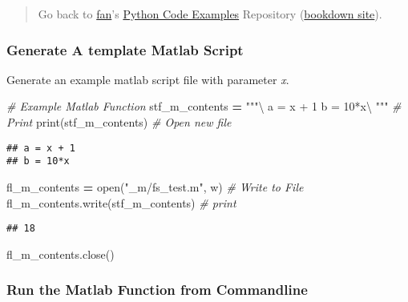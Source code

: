 \documentclass[
]{book}
\newenvironment{Shaded}{\begin{snugshade}}{\end{snugshade}}
\newcommand{\BuiltInTok}[1]{#1}
\newcommand{\CommentTok}[1]{\textcolor[rgb]{0.56,0.35,0.01}{\textit{#1}}}
\newcommand{\NormalTok}[1]{#1}
\newcommand{\OperatorTok}[1]{\textcolor[rgb]{0.81,0.36,0.00}{\textbf{#1}}}
\newcommand{\StringTok}[1]{\textcolor[rgb]{0.31,0.60,0.02}{#1}}
\begin{document}
\begin{quote}
Go back to \href{http://fanwangecon.github.io/}{fan}'s \href{https://fanwangecon.github.io/pyfan/}{Python Code Examples} Repository (\href{https://fanwangecon.github.io/pyfan/bookdown}{bookdown site}).
\end{quote}

\hypertarget{generate-a-template-matlab-script}{%
\subsubsection{Generate A template Matlab Script}\label{generate-a-template-matlab-script}}

Generate an example matlab script file with parameter \emph{x}.

\begin{Shaded}
\begin{Highlighting}[]
\CommentTok{\# Example Matlab Function}
\NormalTok{stf\_m\_contents }\OperatorTok{=} \StringTok{"""\textbackslash{}}
\StringTok{a = x + 1}
\StringTok{b = 10*x\textbackslash{}}
\StringTok{"""}
\CommentTok{\# Print}
\BuiltInTok{print}\NormalTok{(stf\_m\_contents)}
\CommentTok{\# Open new file}
\end{Highlighting}
\end{Shaded}

\begin{verbatim}
## a = x + 1
## b = 10*x
\end{verbatim}

\begin{Shaded}
\begin{Highlighting}[]
\NormalTok{fl\_m\_contents }\OperatorTok{=} \BuiltInTok{open}\NormalTok{(}\StringTok{"\_m/fs\_test.m"}\NormalTok{, }\StringTok{\textquotesingle{}w\textquotesingle{}}\NormalTok{)}
\CommentTok{\# Write to File}
\NormalTok{fl\_m\_contents.write(stf\_m\_contents)}
\CommentTok{\# print}
\end{Highlighting}
\end{Shaded}

\begin{verbatim}
## 18
\end{verbatim}

\begin{Shaded}
\begin{Highlighting}[]
\NormalTok{fl\_m\_contents.close()}
\end{Highlighting}
\end{Shaded}

\hypertarget{run-the-matlab-function-from-commandline}{%
\subsubsection{Run the Matlab Function from Commandline}\label{run-the-matlab-function-from-commandline}}
\end{document}

